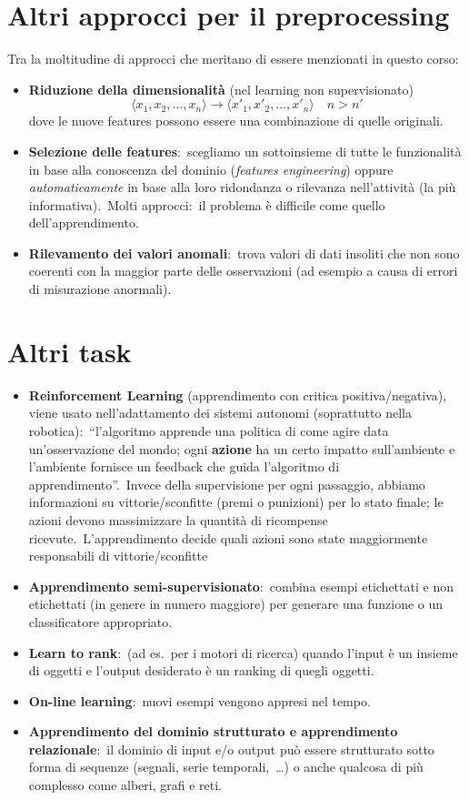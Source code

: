 \section{Altri approcci per il preprocessing}

Tra la moltitudine di approcci che meritano di essere menzionati in questo corso:
\begin{itemize}
	\item \textbf{Riduzione della dimensionalità} (nel learning non supervisionato) \[\langle x_1,x_2,\dots,x_n\rangle\rightarrow\langle x'_1,x'_2,\dots,x'_n\rangle\quad n>n'\] dove le nuove features possono essere una combinazione di quelle originali.
	\item \textbf{Selezione delle features}:\ scegliamo un sottoinsieme di tutte le funzionalità in base alla conoscenza del dominio (\textit{features engineering}) oppure \textit{automaticamente} in base alla loro ridondanza o rilevanza nell'attività (la più informativa).\ Molti approcci:\ il problema è difficile come quello dell'apprendimento.
	\item \textbf{Rilevamento dei valori anomali}:\ trova valori di dati insoliti che non sono coerenti con la maggior parte delle osservazioni (ad esempio a causa di errori di misurazione anormali).
\end{itemize}

\section{Altri task}
\begin{itemize}
	\item \textbf{Reinforcement Learning} (apprendimento con critica positiva{\slash}nega\-tiva), viene usato nell'adattamento dei sistemi autonomi (soprattutto nella robotica):\ ``l'algoritmo apprende una politica di come agire data un'osservazione del mondo; ogni \textbf{azione} ha un certo impatto sull'ambiente e l'ambiente fornisce un feedback che guida l'algoritmo di apprendimento''.\ Invece della supervisione per ogni passaggio, abbiamo informazioni su vittorie/sconfitte (premi o punizioni) per lo stato finale; le azioni devono massimizzare la quantità di ricompense ricevute.\ L'apprendimento decide quali azioni sono state maggiormente responsabili di vittorie/sconfitte
	\item \textbf{Apprendimento semi-supervisionato}:\ combina esempi etichettati e non etichettati (in genere in numero maggiore) per generare una funzione o un classificatore appropriato.
	\item \textbf{Learn to rank}:\ (ad es.\ per i motori di ricerca) quando l'input è un insieme di oggetti e l'output desiderato è un ranking di quegli oggetti.
	\item \textbf{On-line learning}:\ nuovi esempi vengono appresi nel tempo.
	\item \textbf{Apprendimento del dominio strutturato e apprendimento relazionale}:\ il dominio di input e/o output può essere strutturato sotto forma di sequenze (segnali, serie temporali,\ \dots) o anche qualcosa di più complesso come alberi, grafi e reti.
\end{itemize}

